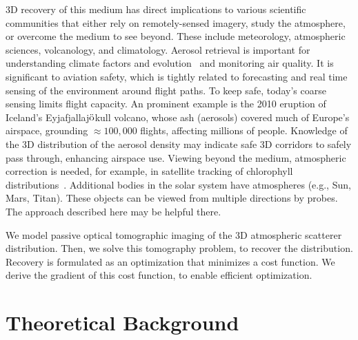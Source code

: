 \documentclass[10pt,twocolumn,letterpaper]{article}
\begin{document}
3D recovery of this medium has direct implications to various scientific communities that either rely on remotely-sensed imagery, study the atmosphere, or overcome the medium to see beyond. These include meteorology, atmospheric sciences, volcanology, and climatology.
Aerosol retrieval %
is important for %
understanding climate factors and evolution~\cite{chud,dayan,kalashnikova} and
monitoring air quality. It is significant to aviation safety, which is tightly related to forecasting and real time sensing of the environment around flight
paths. To keep safe, today's coarse sensing limits flight capacity. An prominent example is the 2010 eruption of Iceland's
Eyjafjallaj$\ddot {\rm o}$kull volcano, whose ash (aerosols) covered much of Europe's airspace, grounding $\approx 100,000$ flights, affecting millions of people. Knowledge of the 3D distribution of the aerosol density may indicate safe 3D corridors to safely pass through, enhancing airspace use. Viewing beyond the medium, atmospheric correction is needed, for example, in satellite tracking of chlorophyll distributions~\cite{chang,johnsen,levy,moses}. Additional bodies in the solar system have atmospheres (e.g., Sun, Mars, Titan). These objects can be viewed from multiple directions by probes.
The approach described here may be helpful there.

We model passive optical tomographic imaging of the 3D atmospheric scatterer distribution. Then, we solve this tomography problem, to recover the distribution. Recovery is formulated as an optimization that minimizes a cost function. We derive the gradient of this cost function, to enable efficient optimization.


\section{Theoretical Background}
\label{sec:back}
 \vspace{-0.2cm}
\end{document}
